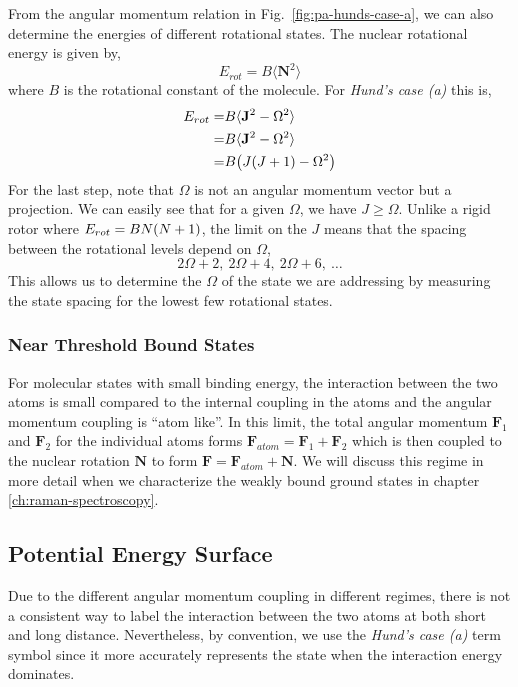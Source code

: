 From the angular momentum relation in Fig.~\ref{fig:pa-hunds-case-a},
we can also determine the energies of different rotational states.
The nuclear rotational energy is given by,
\[
  E_{rot}=B\langle \mathbf{N}^2 \rangle
\]
where $B$ is the rotational constant of the molecule.
For \textit{Hund's case (a)} this is,
\begin{align*}
  E_{rot}=&B\langle \mathbf{J}^2 - \Omega^2 \rangle\\
  =&B\langle \mathbf{J}^2 - \Omega^2 \rangle\\
  =&B{\left({J{\left({J+1}\right)}-\Omega^2}\right)}
\end{align*}
For the last step, note that $\Omega$ is not an angular momentum vector but a projection.
We can easily see that for a given $\Omega$, we have $J\geqslant\Omega$.
Unlike a rigid rotor where $E_{rot}=BN{\left({N+1}\right)}$,
the limit on the $J$ means that the spacing between the rotational levels depend on $\Omega$,
\[2\Omega+2,\ 2\Omega+4,\ 2\Omega+6,\ \dots\]
This allows us to determine the $\Omega$ of the state we are addressing
by measuring the state spacing for the lowest few rotational states.

\subsubsection{Near Threshold Bound States}
\label{pa:structure:near-threshold}

For molecular states with small binding energy, the interaction between the two atoms is
small compared to the internal coupling in the atoms and
the angular momentum coupling is ``atom like''.
In this limit, the total angular momentum $\mathbf{F}_1$ and $\mathbf{F}_2$
for the individual atoms forms $\mathbf{F}_{atom}=\mathbf{F}_1+\mathbf{F}_2$
which is then coupled to the nuclear rotation $\mathbf{N}$
to form $\mathbf{F}=\mathbf{F}_{atom}+\mathbf{N}$.
We will discuss this regime in more detail
when we characterize the weakly bound ground states in chapter \ref{ch:raman-spectroscopy}.

\subsection{Potential Energy Surface}
\label{ch:pa:pes}

Due to the different angular momentum coupling in different regimes,
there is not a consistent way to label the interaction between the two atoms
at both short and long distance.
Nevertheless, by convention, we use the \textit{Hund's case (a)} term symbol
since it more accurately represents the state when the interaction energy dominates.

